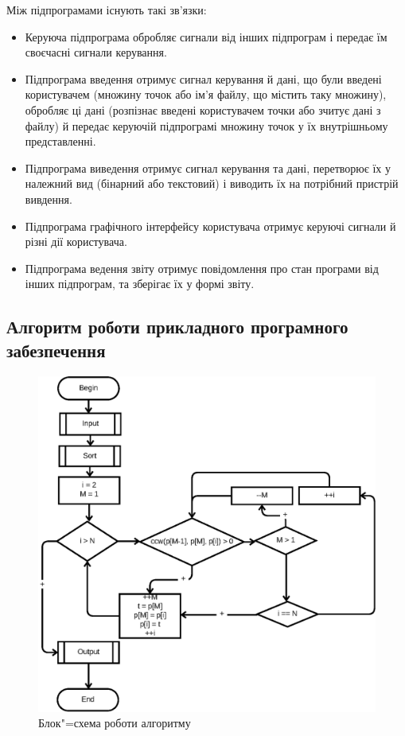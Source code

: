 \documentclass[simple,14pt,utf8,ukrainian]{eskdtext}
\begin{document}
    Між підпрограмами існують такі зв’язки:
    \begin{itemize}
      \item Керуюча підпрограма обробляє сигнали від інших підпрограм і
        передає їм своєчасні сигнали керування.
      \item Підпрограма введення отримує сигнал керування й дані, що були
        введені користувачем (множину точок або ім’я файлу, що містить таку
        множину), обробляє ці дані (розпізнає введені користувачем точки або
        зчитує дані з файлу) й передає керуючій підпрограмі множину точок у їх
        внутрішньому представленні.
      \item Підпрограма виведення отримує сигнал керування та дані, перетворює
        їх у належний вид (бінарний або текстовий) і виводить їх на потрібний
        пристрій вивдення.
      \item Підпрограма графічного інтерфейсу користувача отримує керуючі
        сигнали й різні дії користувача.
      \item Підпрограма ведення звіту отримує повідомлення про стан програми
        від інших підпрограм, та зберігає їх у формі звіту.
    \end{itemize}
  \subsection{Алгоритм роботи прикладного програмного забезпечення}
    \begin{figure}[h]
      \begin{center}
        \includegraphics{algo.eps}
      \end{center}
      \caption{Блок"=схема роботи алгоритму}
      \label{fig:algo}
    \end{figure}
\end{document}

